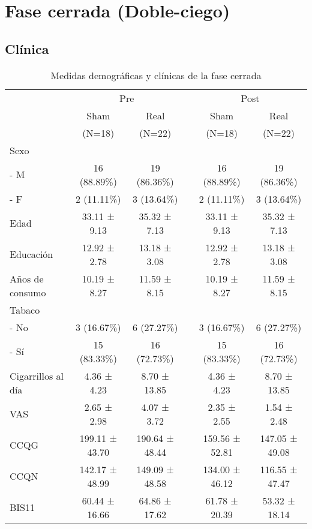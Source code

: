 \section{Fase cerrada (Doble-ciego)}
\subsection{Clínica}

\begin{table}[!ht]
    \small
    \caption{Medidas demográficas y clínicas de la fase cerrada}
    \label{tab:demT}
    \centering
    \begin{tabular}{lccccc}
        \hline
 & \multicolumn{2}{c}{Pre}  &  &\multicolumn{2}{c}{Post} \\
 \cline{2-4}\cline{5-6}
 & Sham & Real & & Sham & Real\\
 & (N=18) & (N=22) &  & (N=18) & (N=22) \\
 \hline
        Sexo            &  &  & &  &  \\
        - M           & 16 (88.89\%) & 19 (86.36\%) &  & 16 (88.89\%) & 19 (86.36\%) \\
        - F           & 2 (11.11\%) & 3 (13.64\%) &  & 2 (11.11\%) & 3 (13.64\%) \\
        Edad            & 33.11 ± 9.13 & 35.32 ± 7.13  &  & 33.11 ± 9.13 & 35.32 ± 7.13 \\
        Educación       & 12.92 ± 2.78 & 13.18 ± 3.08  &  & 12.92 ± 2.78 & 13.18 ± 3.08 \\
        Años de consumo    & 10.19 ± 8.27 & 11.59 ± 8.15  &  & 10.19 ± 8.27 & 11.59 ± 8.15 \\
        Tabaco          &  &   &  &  &   \\
        - No          & 3 (16.67\%) & 6 (27.27\%)  &  & 3 (16.67\%) & 6 (27.27\%)  \\
        - Sí          & 15 (83.33\%) & 16 (72.73\%)  &  & 15 (83.33\%) & 16 (72.73\%) \\
        Cigarrillos al día & 4.36 ± 4.23 & 8.70 ± 13.85  &  & 4.36 ± 4.23 & 8.70 ± 13.85 \\
        \hline
        VAS             & 2.65 ± 2.98 & 4.07 ± 3.72 &  & 2.35 ± 2.55 & 1.54 ± 2.48 \\
        CCQG            & 199.11 ± 43.70 & 190.64 ± 48.44  &  & 159.56 ± 52.81 & 147.05 ± 49.08 \\
        CCQN            & 142.17 ± 48.99 & 149.09 ± 48.58  &  & 134.00 ± 46.12 & 116.55 ± 47.47  \\
        BIS11           & 60.44 ± 16.66 & 64.86 ± 17.62 &  & 61.78 ± 20.39 & 53.32 ± 18.14 \\
        \hline
    \end{tabular}
\end{table}


